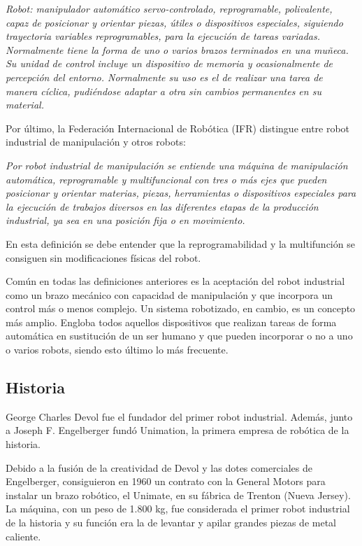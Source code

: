 \documentclass[12pt,a4papert,woside,openright,titlepage,final]{book}
\begin{document}
\emph{Robot: manipulador automático servo-controlado, reprogramable, polivalente,
capaz de posicionar y orientar piezas, útiles o dispositivos especiales,
siguiendo trayectoria variables reprogramables, para la ejecución de tareas
variadas. Normalmente tiene la forma de uno o varios brazos terminados en una
muñeca. Su unidad de control incluye un dispositivo de memoria y ocasionalmente
de percepción del entorno. Normalmente su uso es el de realizar una tarea de
manera cíclica, pudiéndose adaptar a otra sin cambios permanentes en su
material.}

Por último, la Federación Internacional de Robótica (IFR) distingue entre robot
industrial de manipulación y otros robots:

\emph{Por robot industrial de manipulación se entiende una máquina de manipulación
automática, reprogramable y multifuncional con tres o más ejes que pueden
posicionar y orientar materias, piezas, herramientas o dispositivos especiales
para la ejecución de trabajos diversos en las diferentes etapas de la producción
industrial, ya sea en una posición fija o en movimiento.}

En esta definición se debe entender que la reprogramabilidad y la multifunción
se consiguen sin modificaciones físicas del robot.

Común en todas las definiciones anteriores es la aceptación del robot industrial
como un brazo mecánico con capacidad de manipulación y que incorpora un control
más o menos complejo. Un sistema robotizado, en cambio, es un concepto más
amplio. Engloba todos aquellos dispositivos que realizan tareas de forma
automática en sustitución de un ser humano y que pueden incorporar o no a uno
o varios robots, siendo esto último lo más frecuente.

\subsection{Historia}

George Charles Devol fue el fundador del primer robot industrial.
Además, junto a Joseph F. Engelberger fundó Unimation, la primera empresa de
robótica de la historia.

Debido a la fusión de la creatividad de Devol y las dotes comerciales de
Engelberger, consiguieron en 1960 un contrato con la General Motors para
instalar un brazo robótico, el Unimate, en su fábrica de Trenton (Nueva Jersey).
La máquina, con un peso de 1.800 kg, fue considerada el primer robot industrial
de la historia y su función era la de levantar y apilar grandes piezas de metal
caliente.
\end{document}

